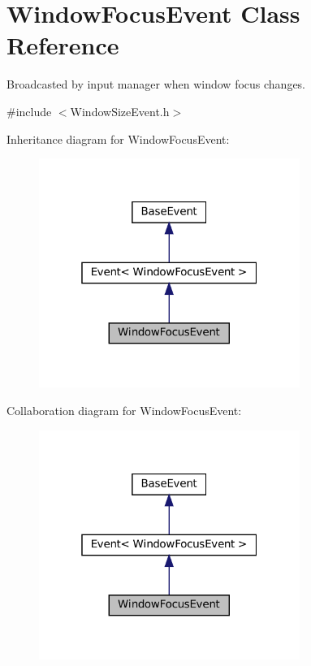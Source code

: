 \hypertarget{classWindowFocusEvent}{}\section{Window\+Focus\+Event Class Reference}
\label{classWindowFocusEvent}


Broadcasted by input manager when window focus changes.  




{\ttfamily \#include $<$Window\+Size\+Event.\+h$>$}



Inheritance diagram for Window\+Focus\+Event\+:
\nopagebreak
\begin{figure}[H]
\begin{center}
\leavevmode
\includegraphics[width=241pt]{classWindowFocusEvent__inherit__graph}
\end{center}
\end{figure}


Collaboration diagram for Window\+Focus\+Event\+:
\nopagebreak
\begin{figure}[H]
\begin{center}
\leavevmode
\includegraphics[width=241pt]{classWindowFocusEvent__coll__graph}
\end{center}
\end{figure}
